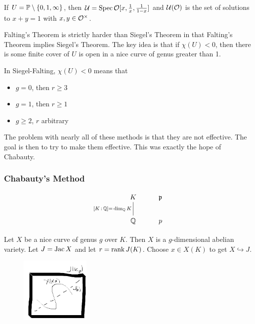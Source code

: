 \begin{ex}
If $U= \P \setminus \{0,1,\infty\}$, then $\cU= \spec \O[x, \frac{1}{x},\frac{1}{1-x}]$ and $\cU(\O)$ is the set of solutions to $x+y=1$ with $x,y \in \O^\times$. 
\end{ex}


\begin{rem}
Falting's Theorem is strictly harder than Siegel's Theorem in that Falting's Theorem implies Siegel's Theorem. The key idea is that if $\chi(U)<0$, then there is some finite \etale cover of $U$ is open in a nice curve of genus greater than 1.  
\end{rem}


In Siegel-Falting, $\chi(U)<0$ means that 


\begin{itemize}
\item $g=0$, then $r \geq 3$
\item $g=1$, then $r \geq 1$
\item $g \geq 2$, $r$ arbitrary 
\end{itemize}


The problem with nearly all of these methods is that they are not effective. The goal is then to try to make them effective. This was exactly the hope of Chabauty. 



\subsubsection{Chabauty's Method}

	\[
	\begin{tikzcd}
	K \arrow[dash,swap]{d}{[K\,:\,\Q]=\,\dim_\Q K} & \p \\
	\Q & p 
	\end{tikzcd}
	\]

Let $X$ be a nice curve of genus $g$ over $K$. Then $X$ is a $g$-dimensional abelian variety. Let $J= \jac  X$ and let $r= \rank J(K)$. Choose $x \in X(K)$ to get $X \hookrightarrow J$. 

	\begin{figure}[!ht]
	\centering 
	\includegraphics[width=0.3\textwidth]{../images/im1.png}
	\end{figure}
	
